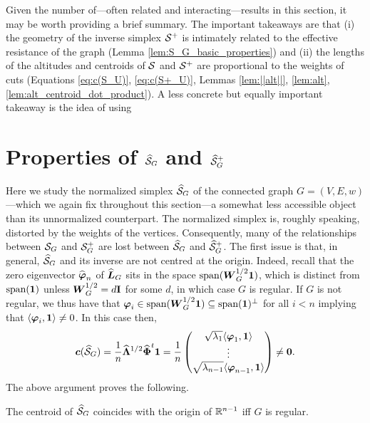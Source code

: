 Given the number of---often related and interacting---results in this section, it may be worth providing a brief summary. The important takeaways are that (i) the geometry of the inverse simplex $\mathcal{S}^+$ is intimately related to the effective resistance of the graph (Lemma \ref{lem:S_G_basic_properties}) and (ii) the lengths of the altitudes and centroids of $\mathcal{S}$ and $\mathcal{S}^+$ are proportional to the weights of cuts (Equations \eqref{eq:c(S_U)}, \eqref{eq:c(S+_U)}, Lemmas \ref{lem:||alt||}, \ref{lem:alt}, \ref{lem:alt_centroid_dot_product}). A less concrete but equally important takeaway is the idea of using  \todo {}

\section{Properties of \texorpdfstring{$\widehat{\mathcal{S}}_G$}{the normalized Simplex} and \texorpdfstring{$\widehat{\mathcal{S}}_G^+$}{and its inverse}}
\label{sec:Sn_G}

Here we study the normalized simplex $\widehat{\mathcal{S}}_G$ of the connected graph $G=(V,E,w)$---which we again fix throughout this section---a somewhat less accessible object than its unnormalized counterpart.  The normalized simplex is, roughly speaking, distorted by the weights of the vertices. Consequently, many of the relationships between $\mathcal{S}_G$ and $\mathcal{S}_G^+$ are lost between $\widehat{\mathcal{S}}_G$ and $\widehat{\mathcal{S}}_G^+$. The first issue is that, in general, $\widehat{\mathcal{S}}_G$ and its inverse are not centred at the origin. Indeed, recall that the zero eigenvector $\widehat{\vb*{\varphi}}_n$ of $\widehat{\vb*{L}}_G$ sits in the space $\textnormal{span}(\vb*{W}^{1/2}_G\vb{1})$, which is distinct from $\textnormal{span}(\vb{1})$ unless $\vb*{W}^{1/2}_G=d\vb{I}$ for some $d$, in which case $G$ is regular.
If $G$ is not regular, we thus have that $\vb*{\varphi}_i \in \textnormal{span}(\vb*{W}^{1/2}_G\vb{1})\subseteq \textnormal{span}(\vb{1})^\perp$ for all $i<n$ implying that $\langle \vb*{\varphi}_i,\vb{1}\rangle \neq 0$. In this case then,  
 \[\vb*{c}(\widehat{\mathcal{S}}_G) = \frac{1}{n} \widehat{\vb{\Lambda}}^{1/2}\widehat{\boldsymbol{\Phi}}^t \vb{1} = \frac{1}{n} \begin{pmatrix}
 \sqrt{\lambda_1}\langle \vb*{\varphi}_1,\vb{1}\rangle \\
 \vdots \\
\sqrt{ \lambda_{n-1}}\langle \vb*{\varphi}_{n-1},\vb{1} \rangle
 \end{pmatrix}\neq \vb{0}.\]
The above argument proves the following.

\begin{lemma}
	\label{lem:centroid_normalized}
	The centroid of $\widehat{\mathcal{S}}_G$ coincides with the origin of $\mathbb{R}^{n-1}$ iff $G$ is regular. 
\end{lemma}

